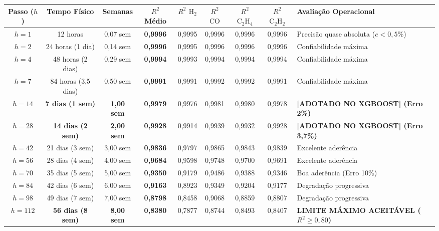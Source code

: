 \documentclass[10pt,a4paper]{article}
\begin{document}
\begin{table}[H]
\centering
\small
\begin{tabularx}{\textwidth}{c c c c c c c c X}
\toprule
\textbf{Passo ($h$)} & \textbf{Tempo Físico} & \textbf{Semanas} & \textbf{$R^2$ Médio} & \textbf{$R^2$ $\text{H}_2$} & \textbf{$R^2$ $\text{CO}$} & \textbf{$R^2$ $\text{C}_2\text{H}_4$} & \textbf{$R^2$ $\text{C}_2\text{H}_2$} & \textbf{Avaliação Operacional} \\
\midrule
$h=1$ & 12 horas & 0,07 sem & \textbf{0,9996} & 0,9995 & 0,9996 & 0,9996 & 0,9996 & Precisão quase absoluta ($e < 0,5\%$) \\
$h=2$ & 24 horas (1 dia) & 0,14 sem & \textbf{0,9996} & 0,9995 & 0,9996 & 0,9996 & 0,9996 & Confiabilidade máxima \\
$h=4$ & 48 horas (2 dias) & 0,29 sem & \textbf{0,9994} & 0,9993 & 0,9994 & 0,9994 & 0,9994 & Confiabilidade máxima \\
$h=7$ & 84 horas (3,5 dias) & 0,50 sem & \textbf{0,9991} & 0,9991 & 0,9992 & 0,9992 & 0,9991 & Confiabilidade máxima \\
\textbf{$h=14$} & \textbf{7 dias (1 sem)} & \textbf{1,00 sem} & \textbf{0,9979} & 0,9976 & 0,9981 & 0,9980 & 0,9978 & \textbf{[ADOTADO NO XGBOOST] (Erro 2\%)} \\
\textbf{$h=28$} & \textbf{14 dias (2 sem)} & \textbf{2,00 sem} & \textbf{0,9928} & 0,9914 & 0,9939 & 0,9932 & 0,9928 & \textbf{[ADOTADO NO XGBOOST] (Erro 3,7\%)} \\
$h=42$ & 21 dias (3 sem) & 3,00 sem & \textbf{0,9836} & 0,9797 & 0,9865 & 0,9843 & 0,9839 & Excelente aderência \\
$h=56$ & 28 dias (4 sem) & 4,00 sem & \textbf{0,9684} & 0,9598 & 0,9748 & 0,9700 & 0,9691 & Excelente aderência \\
$h=70$ & 35 dias (5 sem) & 5,00 sem & \textbf{0,9350} & 0,9179 & 0,9486 & 0,9388 & 0,9346 & Boa aderência (Erro 10\%) \\
$h=84$ & 42 dias (6 sem) & 6,00 sem & \textbf{0,9163} & 0,8923 & 0,9349 & 0,9204 & 0,9177 & Degradação progressiva \\
$h=98$ & 49 dias (7 sem) & 7,00 sem & \textbf{0,8798} & 0,8458 & 0,9068 & 0,8859 & 0,8807 & Degradação progressiva \\
\textbf{$h=112$} & \textbf{56 dias (8 sem)} & \textbf{8,00 sem} & \textbf{0,8380} & 0,7877 & 0,8744 & 0,8493 & 0,8407 & \textbf{LIMITE MÁXIMO ACEITÁVEL ($R^2 \ge 0,80$)} \\
\bottomrule
\end{tabularx}
\end{table}
\end{document}
